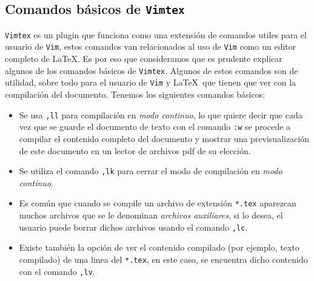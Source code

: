 \documentclass[10pt]{article}
\begin{document}
\subsection{Comandos básicos de \texttt{Vimtex}}
\texttt{Vimtex} es un plugin que funciona como una extensión de comandos utiles para el usuario de \texttt{Vim}, estos comandos van relacionados al uso de \texttt{Vim} como un editor completo de \LaTeX. Es por eso que consideramos que es prudente explicar algunos de los comandos básicos de \texttt{Vimtex}. 
Algunos de estos comandos son de utilidad, sobre todo para el usuario de \texttt{Vim} y \LaTeX \ que tienen que ver con la compilación del documento. \newline
Tenemos los siguientes comandos básicos:
\begin{itemize}
	\item Se usa \texttt{,ll} para compilación en \textit{modo continuo}, lo que quiere decir que cada vez que se guarde el documento de texto con el comando \texttt{:w} se procede a compilar el contenido completo del documento y mostrar una previsualización de este documento en un lector de archivos pdf de su elección.
	\item Se utiliza el comando \texttt{,lk} para cerrar el modo de compilación en \textit{modo continuo}.
	\item Es común que cuando se compile un archivo de extensión \texttt{*.tex} aparezcan muchos archivos que se le denominan \textit{archivos auxiliares}, si lo desea, el usuario puede borrar dichos archivos usando el comando \texttt{,lc}.
	\item Existe también la opción de ver el contenido compilado (por ejemplo, texto compilado)  de una linea del \texttt{*.tex}, en este caso, se encuentra dicho contenido con el comando \texttt{,lv}.
\end{itemize}
\end{document}
